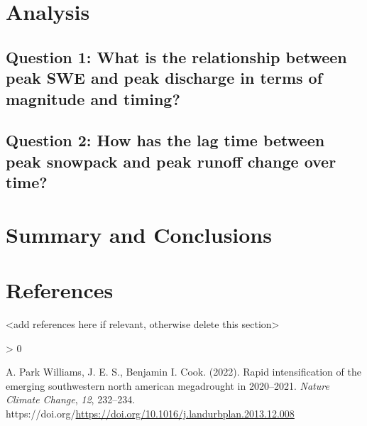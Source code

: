 \documentclass[
  12pt,
]{article}
\newlength{\cslhangindent}
\newenvironment{CSLReferences}[2] %
 {%
  \setlength{\parindent}{0pt}
  \ifodd #1 \everypar{\setlength{\hangindent}{\cslhangindent}}\ignorespaces\fi
  \ifnum #2 > 0
  \setlength{\parskip}{#2\baselineskip}
  \fi
 }%
 {}
\begin{document}
\newpage

\hypertarget{analysis}{%
\section{Analysis}\label{analysis}}

\hypertarget{question-1-what-is-the-relationship-between-peak-swe-and-peak-discharge-in-terms-of-magnitude-and-timing}{%
\subsection{Question 1: What is the relationship between peak SWE and
peak discharge in terms of magnitude and
timing?}\label{question-1-what-is-the-relationship-between-peak-swe-and-peak-discharge-in-terms-of-magnitude-and-timing}}

\hypertarget{question-2-how-has-the-lag-time-between-peak-snowpack-and-peak-runoff-change-over-time}{%
\subsection{Question 2: How has the lag time between peak snowpack and
peak runoff change over
time?}\label{question-2-how-has-the-lag-time-between-peak-snowpack-and-peak-runoff-change-over-time}}

\newpage

\hypertarget{summary-and-conclusions}{%
\section{Summary and Conclusions}\label{summary-and-conclusions}}

\newpage

\hypertarget{references}{%
\section{References}\label{references}}

\textless add references here if relevant, otherwise delete this
section\textgreater{}

\hypertarget{refs}{}
\begin{CSLReferences}{1}{0}
\leavevmode\hypertarget{ref-WILLIAMS2022232}{}%
A. Park Williams, J. E. S., Benjamin I. Cook. (2022). Rapid
intensification of the emerging southwestern north american megadrought
in 2020--2021. \emph{Nature Climate Change}, \emph{12}, 232--234.
https://doi.org/\url{https://doi.org/10.1016/j.landurbplan.2013.12.008}

\end{CSLReferences}
\end{document}
